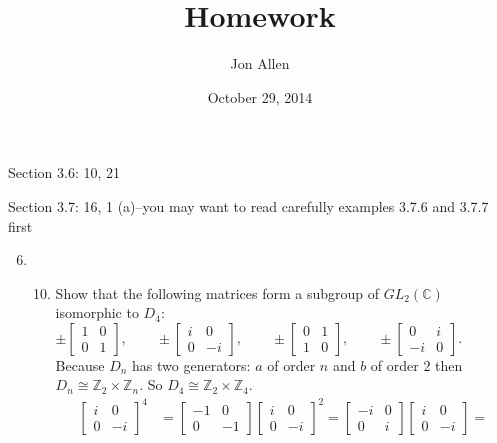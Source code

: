 \documentclass[letterpaper]{article}
\begin{document}
\title{Homework}
\date{October 29, 2014}
\author{Jon Allen}
\maketitle
Section 3.6: 10, 21

Section 3.7:  16, 1 (a)--you may want to read carefully examples 3.7.6 and 3.7.7 first
\renewcommand{\labelenumi}{3.\arabic{enumi}}
\renewcommand{\labelenumii}{\arabic{enumii}.}
\renewcommand{\labelenumiii}{(\alph{enumiii})}
\begin{enumerate}
\setcounter{enumi}{5}
\item
  \begin{enumerate}
  \setcounter{enumii}{9}
  \item
    Show that the following matrices form a subgroup of $GL_2(\mathbb{C})$ isomorphic to $D_4$:
    \[
      \pm\left[\begin{array}{cc}1&0\\0&1\end{array}\right],\qquad
      \pm\left[\begin{array}{cc}i&0\\0&-i\end{array}\right],\qquad
      \pm\left[\begin{array}{cc}0&1\\1&0\end{array}\right],\qquad
      \pm\left[\begin{array}{cc}0&i\\-i&0\end{array}\right].\qquad\qquad
    \]
    Because $D_n$ has two generators: $a$ of order $n$ and $b$ of order $2$ then $D_n\cong \mathbb{Z}_2\times\mathbb{Z}_n$. So $D_4\cong \mathbb{Z}_2\times\mathbb{Z}_4$.
    \begin{align*}
      \left[\begin{array}{cc}i&0\\0&-i\end{array}\right]^4&=
      \left[\begin{array}{cc}-1&0\\0&-1\end{array}\right]\left[\begin{array}{cc}i&0\\0&-i\end{array}\right]^2=
      \left[\begin{array}{cc}-i&0\\0&i\end{array}\right]\left[\begin{array}{cc}i&0\\0&-i\end{array}\right]=

\end{align*}
\end{enumerate}
\end{enumerate}
\end{document}
